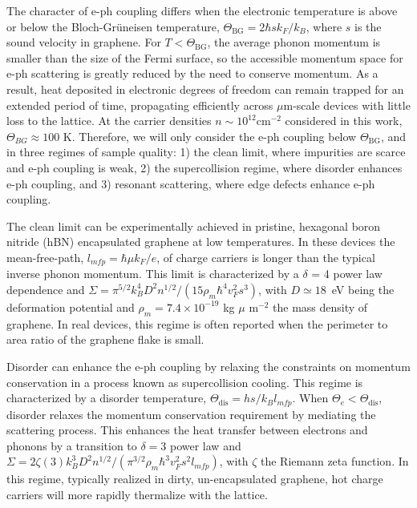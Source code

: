 \documentclass[aip, amsmath,amssymb, reprint]{revtex4-1}
\begin{document}
The character of e-ph coupling differs when the electronic temperature is above or below the Bloch-Gr{\"u}neisen temperature, $\Theta_{\text{BG}} = 2 \hbar s k_{F} / k_B$, where $s$ is the sound velocity in graphene\cite{Viljas.2010}. For $T<\Theta_{\text{BG}}$, the average phonon momentum is smaller than the size of the Fermi surface, so the accessible momentum space for e-ph scattering is greatly reduced by the need to conserve momentum\cite{stormer.1990,Viljas.2010,Efetov.2010}. As a result, heat deposited in electronic degrees of freedom can remain trapped for an extended period of time, propagating efficiently across $\mu$m-scale devices with little loss to the lattice. At the carrier densities $n \sim 10^{12} \text{cm}^{-2}$ considered in this work, $\Theta_{BG} \approx 100$ K. Therefore, we will only consider the e-ph coupling below $\Theta_{\text{BG}}$, and in three regimes of sample quality: 1) the clean limit, where impurities are scarce and e-ph coupling is weak, 2) the supercollision regime, where disorder enhances e-ph coupling, and 3) resonant scattering, where edge defects enhance e-ph coupling.

The clean limit can be experimentally achieved in pristine, hexagonal boron nitride (hBN) encapsulated graphene at low temperatures. In these devices the mean-free-path, $l_{mfp} = \hbar \mu k_{F} / e$, of charge carriers is longer than the typical inverse phonon momentum. This limit is characterized by a $\delta$ = 4 power law dependence and $\Sigma=\pi^{5/2} k_{B}^{4} D^{2} n^{1/2}/(15 \rho_{m} \hbar^{4} v_{F}^{2} s^{3})$, with $D \simeq 18$~eV being the deformation potential and $\rho_{m}=7.4 \times 10^{-19}$ kg $\mu$ m$^{-2}$ the mass density of graphene. In real devices, this regime is often reported when the perimeter to area ratio of the graphene flake is small\cite{Fong.2012, Betz.2012, Draelos.2019o4h, McKitterick.2016}.

Disorder can enhance the e-ph coupling by relaxing the constraints on momentum conservation in a process known as supercollision cooling\cite{Chen.2012,Song.2012}. This regime is characterized by a disorder temperature, $\Theta_{\text{dis}} = h s/k_{B} l_{mfp}$. When $\Theta_e < \Theta_{\text{dis}}$, disorder relaxes the momentum conservation requirement by mediating the scattering process. This enhances the heat transfer between electrons and phonons by a transition to $\delta = 3$ power law and $\Sigma=2\zeta(3)k_B^3D^2n^{1/2}/(\pi^{3/2}\rho_m\hbar^3v_F^2s^2l_{mfp})$, with $\zeta$ the Riemann zeta function\cite{Chen.2012}. In this regime, typically realized in dirty, un-encapsulated graphene, hot charge carriers will more rapidly thermalize with the lattice\cite{Song.2012,Chen.2012,Graham.2013,Betz.2013,Fong.2013,Ma.2014}.
\end{document}
